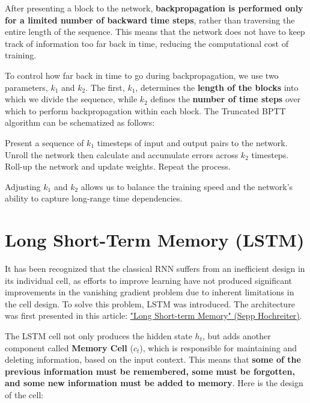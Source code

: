 After presenting a block to the network, \textbf{backpropagation is performed only for a limited number of backward time steps}, rather than traversing the entire length of the sequence. This means that the network does not have to keep track of information too far back in time, reducing the computational cost of training.

To control how far back in time to go during backpropagation, we use two parameters, $k_1$ and $k_2$. The first, $k_1$, determines the \textbf{length of the blocks} into which we divide the sequence, while $k_2$ defines the \textbf{number of time steps} over which to perform backpropagation within each block. The Truncated BPTT algorithm can be schematized as follows:

\begin{algorithm}
\renewcommand\thealgorithm{}
\caption{}
\begin{algorithmic}[1]
\STATE Present a sequence of $k_1$ timesteps of input and output pairs to the network.
\STATE Unroll the network then calculate and accumulate errors across $k_2$ timesteps.
\STATE Roll-up the network and update weights.
\STATE Repeat the process.
\end{algorithmic}
\end{algorithm}
Adjusting $k_1$ and $k_2$ allows us to balance the training speed and the network's ability to capture long-range time dependencies.

\section{Long Short-Term Memory (LSTM)}

It has been recognized that the classical RNN suffers from an inefficient design in its individual cell, as efforts to improve learning have not produced significant improvements in the vanishing gradient problem due to inherent limitations in the cell design. To solve this problem, LSTM was introduced. The architecture was first presented in this article: \href{https://deeplearning.cs.cmu.edu/F23/document/readings/LSTM.pdf}{"Long Short-term Memory" (Sepp Hochreiter)}.

The LSTM cell not only produces the hidden state $h_t$, but adds another component called \textbf{Memory Cell} ($c_t$), which is responsible for maintaining and deleting information, based on the input context. This means that \textbf{some of the previous information must be remembered, some must be forgotten, and some new information must be added to memory}. Here is the design of the cell:

